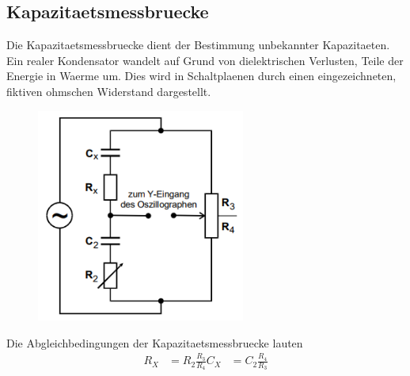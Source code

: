 \subsection{Kapazitaetsmessbruecke}
Die Kapazitaetsmessbruecke dient der Bestimmung unbekannter Kapazitaeten. Ein realer Kondensator wandelt auf Grund von dielektrischen Verlusten, Teile der Energie in Waerme um. Dies wird in Schaltplaenen durch einen eingezeichneten, fiktiven ohmschen Widerstand dargestellt.
\begin{figure}[H]
    \centering
    \captionsetup{justification=centering}
    \includegraphics[height=7cm]{"Kapazitaet_Brueckenschaltung.png"}
    \label{Fig:Kapazitaet}
\end{figure}
Die Abgleichbedingungen der Kapazitaetsmessbruecke lauten 
\begin{align}
    R_X&=R_2\frac{R_3}{R_4}
    C_X&=C_2\frac{R_4}{R_3}
\end{align}
